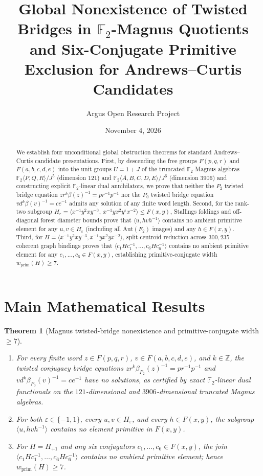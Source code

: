 \documentclass[10pt,reqno]{amsart}
\title[Magnus Quotient Obstructions and Primitive-Conjugate Width at Least 7]
{Global Nonexistence of Twisted Bridges in $\mathbb{F}_2$-Magnus Quotients and Six-Conjugate Primitive Exclusion for Andrews--Curtis Candidates}
\author{Argus Open Research Project}
\date{November 4, 2026}
\newtheorem{theorem}{Theorem}[section]
\theoremstyle{definition}
\begin{document}
\begin{abstract}
We establish four unconditional global obstruction theorems for standard Andrews--Curtis candidate presentations. First, by descending the free groups $F(p,q,r)$ and $F(a,b,c,d,e)$ into the unit groups $U = 1+J$ of the truncated $\mathbb{F}_2$-Magnus algebras $\mathbb{F}_2\langle P,Q,R\rangle/J^5$ (dimension $121$) and $\mathbb{F}_2\langle A,B,C,D,E\rangle/J^6$ (dimension $3906$) and constructing explicit $\mathbb{F}_2$-linear dual annihilators, we prove that neither the $P_2$ twisted bridge equation $z r^k \beta(z)^{-1} = p r^{-1} p^{-1}$ nor the $P_0$ twisted bridge equation $v d^k \beta(v)^{-1} = c e^{-1}$ admits any solution of any finite word length. Second, for the rank-two subgroup $H_\varepsilon = \langle x^{-1}y^2xy^{-3},\ x^{-1}yx^2y^\varepsilon x^{-2}\rangle \le F(x,y)$, Stallings foldings and off-diagonal forest diameter bounds prove that $\langle u, h v h^{-1}\rangle$ contains no ambient primitive element for any $u,v \in H_\varepsilon$ (including all $\mathrm{Aut}(F_2)$ images) and any $h \in F(x,y)$. Third, for $H = \langle x^{-1}y^2xy^{-3}, x^{-1}yx^2yx^{-2}\rangle$, split-centroid reduction across $300{,}235$ coherent graph bindings proves that $\langle c_1 H c_1^{-1},\ldots,c_6 H c_6^{-1}\rangle$ contains no ambient primitive element for any $c_1,\ldots,c_6 \in F(x,y)$, establishing primitive-conjugate width $w_{\mathrm{prim}}(H) \ge 7$.
\end{abstract}
\maketitle

\section{Main Mathematical Results}
\begin{theorem}[Magnus twisted-bridge nonexistence and primitive-conjugate width $\ge 7$]
\begin{enumerate}[label=\textup{(\arabic*)}]
  \item For every finite word $z \in F(p,q,r)$, $v \in F(a,b,c,d,e)$, and $k \in \mathbb{Z}$, the twisted conjugacy bridge equations $z r^k \beta_{P_2}(z)^{-1} = p r^{-1} p^{-1}$ and $v d^k \beta_{P_0}(v)^{-1} = c e^{-1}$ have no solutions, as certified by exact $\mathbb{F}_2$-linear dual functionals on the $121$-dimensional and $3906$-dimensional truncated Magnus algebras.
  \item For both $\varepsilon \in \{-1,1\}$, every $u,v \in H_\varepsilon$, and every $h \in F(x,y)$, the subgroup $\langle u, h v h^{-1}\rangle$ contains no element primitive in $F(x,y)$.
  \item For $H = H_{+1}$ and any six conjugators $c_1,\ldots,c_6 \in F(x,y)$, the join $\langle c_1 H c_1^{-1},\ldots,c_6 H c_6^{-1}\rangle$ contains no ambient primitive element; hence $w_{\mathrm{prim}}(H) \ge 7$.
\end{enumerate}
\end{theorem}
\end{document}
